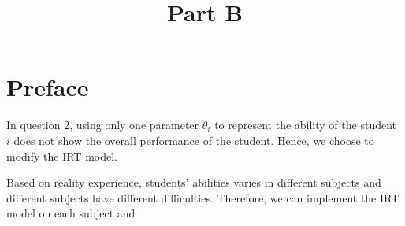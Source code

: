 \documentclass{article}
\title{Part B}
\date{\vspace{-7.5ex}}
\begin{document}
\maketitle
\thispagestyle{fancy}

\section*{Preface}

In question 2, using only one parameter $\theta_i$ to represent the ability of the student $i$ does not show the overall performance of the student. Hence, we choose to modify the IRT model.

Based on reality experience, students' abilities varies in different subjects and different subjects have different difficulties. Therefore, we can implement the IRT model on each subject and 
\end{document}
